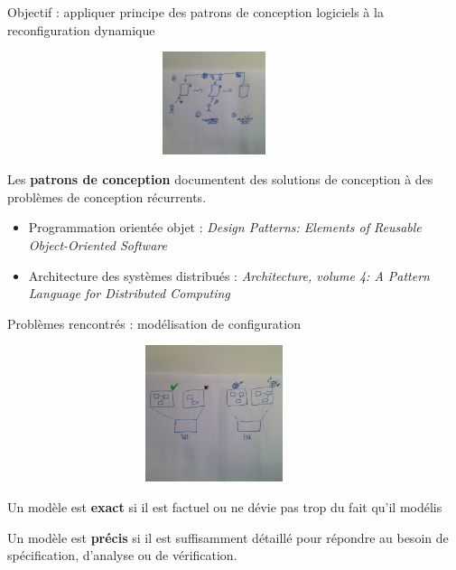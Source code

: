\begin{frame}{Objectif : appliquer principe des patrons de conception logiciels à la reconfiguration dynamique}
\begin{figure}
\includegraphics[width=10cm, height=3cm]{imgs/slide_application_patron}
\end{figure}
\begin{definition}
Les \textbf{patrons de conception} documentent des solutions de
conception à des problèmes de conception récurrents.
\end{definition}
\begin{exampleblock}{}
\begin{itemize}
\item Programmation orientée objet : \textit{Design Patterns: Elements of
Reusable Object-Oriented Software} 
\item Architecture des systèmes distribués : \textit{Architecture,
volume 4: A Pattern Language for Distributed Computing}
\end{itemize}
\end{exampleblock}
\end{frame}

\begin{frame}{Problèmes rencontrés : modélisation de configuration}
\begin{figure}
\centering
\includegraphics[width=10cm, height=4cm]{imgs/slide_probleme_modelisation.jpg}
\end{figure} 
\begin{definition}{}
Un modèle est \textbf{exact} si il est
factuel ou ne dévie pas trop du fait qu’il modélis
\end{definition}
\begin{definition}{}
Un modèle est \textbf{précis} si il est suffisamment détaillé pour
répondre au besoin de spécification, d'analyse ou de vérification.
\end{definition}
\end{frame}

